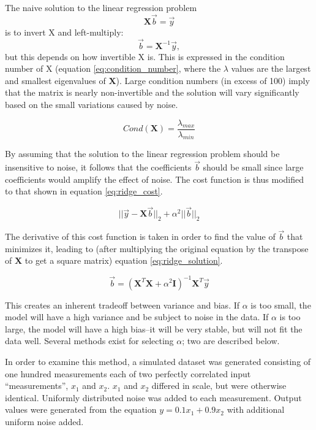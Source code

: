 \documentclass{IEEEtran}
\begin{document}
The naive solution to the linear regression problem $$\mathbf{X} \vec{b} = \vec{y}$$ is to invert $\mathrm{X}$ 
and left-multiply: $$\vec{b} = \mathbf{X}^{-1} \vec{y},$$ but this depends on how invertible X is. This is 
expressed in the condition number of X (equation \ref{eq:condition_number}, where the $\lambda$ values are the 
largest and smallest eigenvalues of $\mathbf{X}$). Large condition numbers (in excess of 100) imply that the 
matrix is nearly non-invertible and the solution will vary significantly based on the small variations caused 
by noise.

\begin{equation}
	Cond(\mathbf{X}) = \frac{\lambda_{max}}{\lambda_{min}}
	\label{eq:condition_number}
\end{equation}

By assuming that the solution to the linear regression problem should be insensitive to noise, it 
follows that the coefficients $\vec{b}$ should be small since large coefficients would amplify the 
effect of noise. The cost function is thus modified to that shown in equation \ref{eq:ridge_cost}.

\begin{equation}
	|| \vec{y} - \mathbf{X} \vec{b} ||_2 + \alpha^2 || \vec{b} ||_2
	\label{eq:ridge_cost}
\end{equation}

The derivative of this cost function is taken in order to find the value of $\vec{b}$ that minimizes 
it, leading to (after multiplying the original equation by the transpose of $\mathbf{X}$ to get a 
square matrix) equation \ref{eq:ridge_solution}.

\begin{equation}
	\vec{b} = (\mathbf{X}^T \mathbf{X} + \alpha^2 \mathbf{I})^{-1} \mathbf{X}^T \vec{y}
	\label{eq:ridge_solution}
\end{equation}

This creates an inherent tradeoff between variance and bias. If $\alpha$ is too small, the model will 
have a high variance and be subject to noise in the data. If $\alpha$ is too large, the model will have 
a high bias--it will be very stable, but will not fit the data well. Several methods exist for selecting 
$\alpha$; two are described below.

In order to examine this method, a simulated dataset was generated consisting of one hundred measurements 
each of two perfectly correlated input ``measurements'', $x_1$ and $x_2$. $x_1$ and $x_2$ differed in scale, 
but were otherwise identical. Uniformly distributed noise was added to each measurement. Output values were 
generated from the equation $y = 0.1 x_1 + 0.9 x_2$ with additional uniform noise added.
\end{document}
